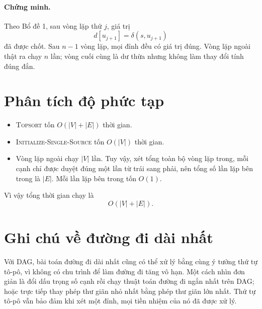 \documentclass[11pt]{article}
\begin{document}
\paragraph{Chứng minh.}
Theo Bổ đề 1, sau vòng lặp thứ $j$, giá trị
\[
  d[u_{j+1}]=\delta(s,u_{j+1})
\]
đã được chốt. Sau $n-1$ vòng lặp, mọi đỉnh đều có giá trị đúng. Vòng lặp
ngoài thật ra chạy $n$ lần; vòng cuối cùng là dư thừa nhưng không làm thay
đổi tính đúng đắn.

\section{Phân tích độ phức tạp}

\begin{itemize}
  \item \textsc{Topsort} tốn $O(|V|+|E|)$ thời gian.
  \item \textsc{Initialize-Single-Source} tốn $O(|V|)$ thời gian.
  \item Vòng lặp ngoài chạy $|V|$ lần. Tuy vậy, xét tổng toàn bộ vòng lặp
  trong, mỗi cạnh chỉ được duyệt đúng một lần từ trái sang phải, nên tổng số
  lần lặp bên trong là $|E|$. Mỗi lần lặp bên trong tốn $O(1)$.
\end{itemize}

Vì vậy tổng thời gian chạy là
\[
  O(|V|+|E|).
\]

\section{Ghi chú về đường đi dài nhất}

Với DAG, bài toán đường đi dài nhất cũng có thể xử lý bằng cùng ý tưởng thứ
tự tô-pô, vì không có chu trình để làm đường đi tăng vô hạn. Một cách nhìn
đơn giản là đổi dấu trọng số cạnh rồi chạy thuật toán đường đi ngắn nhất trên
DAG; hoặc trực tiếp thay phép thư giãn nhỏ nhất bằng phép thư giãn lớn nhất.
Thứ tự tô-pô vẫn bảo đảm khi xét một đỉnh, mọi tiền nhiệm của nó đã được xử
lý.
\end{document}
